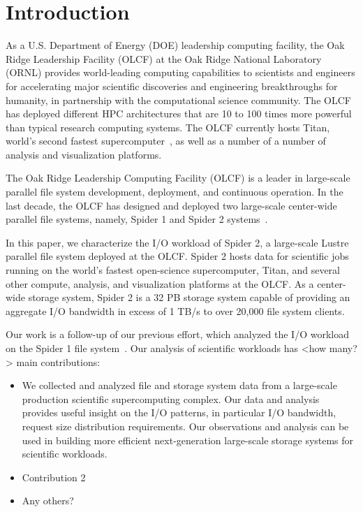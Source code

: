 \section{Introduction}
\label{sec:intro}

As a U.S. Department of Energy (DOE) leadership computing facility, the Oak
Ridge Leadership Facility (OLCF) at the Oak Ridge National Laboratory (ORNL)
provides world-leading computing capabilities to scientists and engineers for
accelerating major scientific discoveries and engineering breakthroughs for
humanity, in partnership with the computational science community. The OLCF has
deployed different HPC architectures that are 10 to 100 times more powerful
than typical research computing systems. The OLCF currently hosts Titan,
world's second fastest supercomputer~\cite{titan}, as well as a number of a
number of analysis and visualization platforms.


The Oak Ridge Leadership Computing Facility (OLCF) is a leader in large-scale
parallel file system development, deployment, and continuous operation. In the
last decade, the OLCF has designed and deployed two large-scale center-wide
parallel file systems, namely, Spider 1 and Spider 2 systems~\cite{spider1,
spider2}. 

In this paper, we characterize the I/O workload of Spider 2, a large-scale
Lustre parallel file system deployed at the OLCF. Spider 2 hosts
data for scientific jobs running on the world's fastest open-science supercomputer, 
Titan, and several other compute, analysis, and visualization platforms at the OLCF. 
As a center-wide storage system, Spider 2 is a 32 PB storage system capable of
providing an aggregate I/O bandwidth in excess of 1 TB/s to over 20,000
file system clients. 

Our work is a follow-up of our previous effort, which analyzed the I/O workload
on the Spider 1 file system~\cite{spider1-workload}.  Our analysis of
scientific workloads has <how many?> main contributions: 

\begin{itemize}


\item We collected and analyzed file and storage system data from a large-scale
production scientific supercomputing complex. Our data and analysis provides
useful insight on the I/O patterns, in particular I/O bandwidth, request size
distribution requirements. Our observations and analysis can be used in
building more efficient next-generation large-scale storage systems for
scientific workloads.  

\item Contribution 2

\item Any others? 

\end{itemize}
